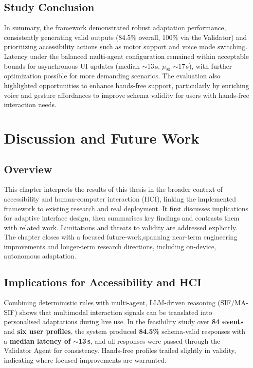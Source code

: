 \documentclass[openany]{book}
\begin{document}
\section{Study Conclusion}
In summary, the framework demonstrated robust adaptation performance, consistently generating valid outputs (84.5\% overall, 100\% via the Validator) and prioritizing accessibility actions such as motor support and voice mode switching. Latency under the balanced multi-agent configuration remained within acceptable bounds for asynchronous UI updates (median $\sim$13\,s, $p_{90}$ $\sim$17\,s), with further optimization possible for more demanding scenarios. The evaluation also highlighted opportunities to enhance hands-free support, particularly by enriching voice and gesture affordances to improve schema validity for users with hands-free interaction needs.

\chapter{Discussion and Future Work}
\label{ch:chapter7}
\section{Overview}
This chapter interprets the results of this thesis in the broader context of accessibility and human-computer interaction (HCI), linking the implemented framework to existing research and real deployment. It first discusses implications for adaptive interface design, then summarises key findings and contrasts them with related work. Limitations and threats to validity are addressed explicitly. The chapter closes with a focused future-work,spanning near-term engineering improvements and longer-term research directions, including on-device, autonomous adaptation.

\section{Implications for Accessibility and HCI}
Combining deterministic rules with multi-agent, LLM-driven reasoning (SIF/MA-SIF) shows that multimodal interaction signals can be translated into personalised adaptations during live use. In the feasibility study over \textbf{84 events} and \textbf{six user profiles}, the system produced \textbf{84.5\%} schema-valid responses with a \textbf{median latency of $\sim$13\,s}, and all responses were passed through the Validator Agent for consistency. Hands-free profiles trailed slightly in validity, indicating where focused improvements are warranted.
\end{document}
